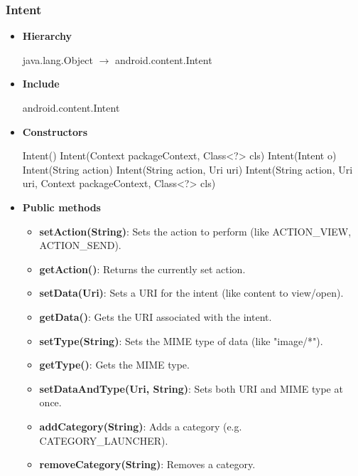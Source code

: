 \documentclass{report}
\begin{document}
    \subsubsection{Intent}
    \begin{itemize}
        \item \textbf{Hierarchy} 
            \begin{center}
                java.lang.Object $\to $	android.content.Intent
            \end{center}
        \item \textbf{Include}
            \bigbreak \noindent 
            \begin{javacode}
                android.content.Intent
            \end{javacode}
        \item \textbf{Constructors}
            \bigbreak \noindent 
            \begin{javacode}
                Intent()
                Intent(Context packageContext, Class<?> cls)
                Intent(Intent o)
                Intent(String action)
                Intent(String action, Uri uri)
                Intent(String action, Uri uri, Context packageContext, Class<?> cls)
            \end{javacode}
        \item \textbf{Public methods}
            \begin{itemize}
                \item \textbf{setAction(String)}:	Sets the action to perform (like ACTION\_VIEW, ACTION\_SEND).
                \item \textbf{getAction()}:	Returns the currently set action.
                \item \textbf{setData(Uri)}:	Sets a URI for the intent (like content to view/open).
                \item \textbf{getData()}:	Gets the URI associated with the intent.
                \item \textbf{setType(String)}:	Sets the MIME type of data (like "image/*").
                \item \textbf{getType()}:	Gets the MIME type.
                \item \textbf{setDataAndType(Uri, String)}:	Sets both URI and MIME type at once.
                \item \textbf{addCategory(String)}:	Adds a category (e.g. CATEGORY\_LAUNCHER).
                \item \textbf{removeCategory(String)}:	Removes a category.

\end{itemize}
\end{itemize}
\end{document}
